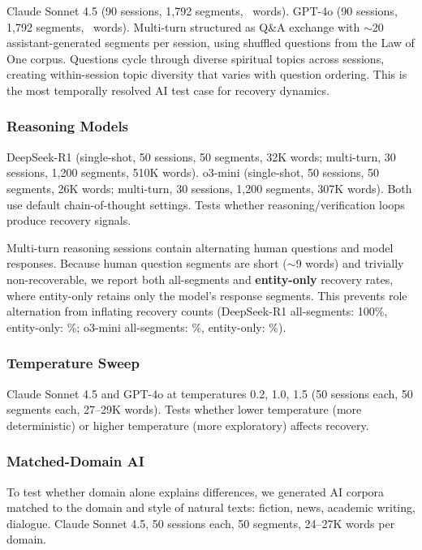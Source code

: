 \documentclass[final]{clv2025}
\begin{document}
Claude Sonnet 4.5 (90 sessions, 1,792 segments, \nMultiturnClaudeWords\ words). GPT-4o (90 sessions, 1,792 segments, \nMultiturnGPTWords\ words). Multi-turn structured as Q\&A exchange with $\sim$20 assistant-generated segments per session, using shuffled questions from the Law of One corpus. Questions cycle through diverse spiritual topics across sessions, creating within-session topic diversity that varies with question ordering. This is the most temporally resolved AI test case for recovery dynamics.

\subsubsection{Reasoning Models}

DeepSeek-R1 (single-shot, 50 sessions, 50 segments, 32K words; multi-turn, 30 sessions, 1,200 segments, 510K words). o3-mini (single-shot, 50 sessions, 50 segments, 26K words; multi-turn, 30 sessions, 1,200 segments, 307K words). Both use default chain-of-thought settings. Tests whether reasoning/verification loops produce recovery signals.

Multi-turn reasoning sessions contain alternating human questions and model responses. Because human question segments are short ($\sim$9 words) and trivially non-recoverable, we report both all-segments and \textbf{entity-only} recovery rates, where entity-only retains only the model's response segments. This prevents role alternation from inflating recovery counts (DeepSeek-R1 all-segments: 100\%, entity-only: \recReasoningDSMTEntity\%; o3-mini all-segments: \recReasoningOiiiMTAll\%, entity-only: \recReasoningOiiiEntity\%).

\subsubsection{Temperature Sweep}

Claude Sonnet 4.5 and GPT-4o at temperatures 0.2, 1.0, 1.5 (50 sessions each, 50 segments each, 27--29K words). Tests whether lower temperature (more deterministic) or higher temperature (more exploratory) affects recovery.

\subsubsection{Matched-Domain AI}

To test whether domain alone explains differences, we generated AI corpora matched to the domain and style of natural texts: fiction, news, academic writing, dialogue. Claude Sonnet 4.5, 50 sessions each, 50 segments, 24--27K words per domain.
\end{document}

